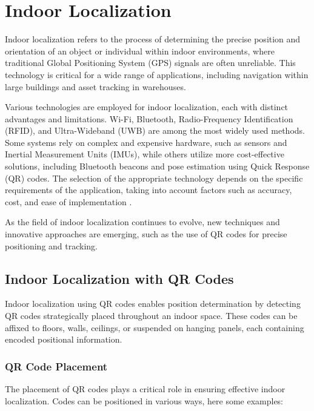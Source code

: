 \section{Indoor Localization}

Indoor localization refers to the process of determining the precise position and orientation of an object or individual within indoor environments, where traditional Global Positioning System (GPS) signals are often unreliable. This technology is critical for a wide range of applications, including navigation within large buildings and asset tracking in warehouses.

Various technologies are employed for indoor localization, each with distinct advantages and limitations. Wi-Fi, Bluetooth, Radio-Frequency Identification (RFID), and Ultra-Wideband (UWB) are among the most widely used methods. Some systems rely on complex and expensive hardware, such as sensors and Inertial Measurement Units (IMUs), while others utilize more cost-effective solutions, including Bluetooth beacons and pose estimation using Quick Response (QR) codes. The selection of the appropriate technology depends on the specific requirements of the application, taking into account factors such as accuracy, cost, and ease of implementation \cite{leitch2023}.

As the field of indoor localization continues to evolve, new techniques and innovative approaches are emerging, such as the use of QR codes for precise positioning and tracking.

\subsection{Indoor Localization with QR Codes}

Indoor localization using QR codes enables position determination by detecting QR codes strategically placed throughout an indoor space. These codes can be affixed to floors, walls, ceilings, or suspended on hanging panels, each containing encoded positional information.

\subsubsection{QR Code Placement}

The placement of QR codes plays a critical role in ensuring effective indoor localization. Codes can be positioned in various ways, here some examples:


